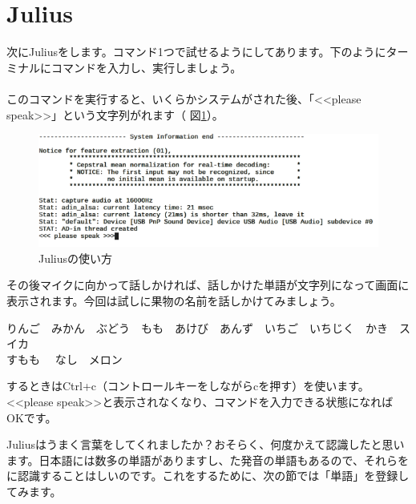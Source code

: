 \newpage
\section{Julius}\label{Julius}
次にJuliusをします。コマンド1つで試せるようにしてあります。下のようにターミナルにコマンドを入力し、実行しましょう。\\
\\
このコマンドを実行すると、いくらかシステムがされた後、「<<please speak>>」という文字列がれます（ 図\ref{juliusの使い方}）。
\begin{figure}[H]
\begin{center}
    \includegraphics[width=.8\linewidth]{images/chap06/text06-img009.png}
    \caption{Juliusの使い方}
    \label{juliusの使い方}
\end{center}
\end{figure}
その後マイクに向かって話しかければ、話しかけた単語が文字列になって画面に表示されます。今回は試しに果物の名前を話しかけてみましょう。
\begin{center}
	りんご　みかん　ぶどう　もも　あけび　あんず　いちご　いちじく　かき　スイカ\\すもも　	なし　メロン
\end{center}
するときはCtrl+c（コントロールキーをしながらcを押す）を使います。<<please speak>>と表示されなくなり、コマンドを入力できる状態になればOKです。

Juliusはうまく言葉をしてくれましたか？おそらく、何度かえて認識したと思います。日本語には数多の単語がありますし、た発音の単語もあるので、それらをに認識することはしいのです。これをするために、次の節では「単語」を登録してみます。\\

\begin{tcolorbox}[title=\useOmetoi]
\begin{enumerate}
\end{enumerate}
\end{tcolorbox}
